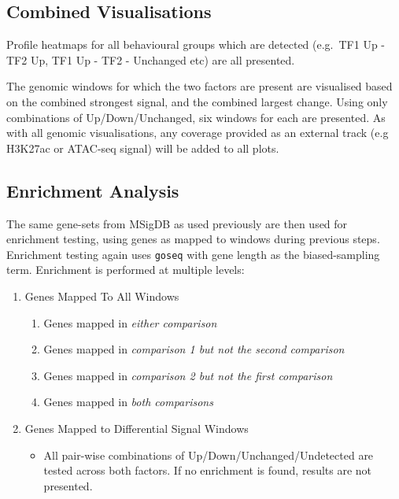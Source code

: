 \documentclass[
]{book}
\providecommand{\tightlist}{%
  \setlength{\itemsep}{0pt}\setlength{\parskip}{0pt}}
\begin{document}
\hypertarget{combined-visualisations}{%
\subsection*{Combined Visualisations}\label{combined-visualisations}}

Profile heatmaps for all behavioural groups which are detected (e.g.~TF1 Up - TF2 Up, TF1 Up - TF2 - Unchanged etc) are all presented.

The genomic windows for which the two factors are present are visualised based on the combined strongest signal, and the combined largest change.
Using only combinations of Up/Down/Unchanged, six windows for each are presented.
As with all genomic visualisations, any coverage provided as an external track (e.g H3K27ac or ATAC-seq signal) will be added to all plots.

\hypertarget{enrichment-analysis}{%
\subsection*{Enrichment Analysis}\label{enrichment-analysis}}

The same gene-sets from MSigDB\citep{msigdb} as used previously are then used for enrichment testing, using genes as mapped to windows during previous steps.
Enrichment testing again uses \texttt{goseq} with gene length as the biased-sampling term.
Enrichment is performed at multiple levels:

\begin{enumerate}
\def\labelenumi{\arabic{enumi}.}
\tightlist
\item
  Genes Mapped To All Windows

  \begin{enumerate}
  \def\labelenumii{\arabic{enumii}.}
  \tightlist
  \item
    Genes mapped in \emph{either comparison}
  \item
    Genes mapped in \emph{comparison 1 but not the second comparison}
  \item
    Genes mapped in \emph{comparison 2 but not the first comparison}
  \item
    Genes mapped in \emph{both comparisons}
  \end{enumerate}
\item
  Genes Mapped to Differential Signal Windows

  \begin{itemize}
  \tightlist
  \item
    All pair-wise combinations of Up/Down/Unchanged/Undetected are tested across both factors. If no enrichment is found, results are not presented.
  \end{itemize}
\end{enumerate}
\end{document}
